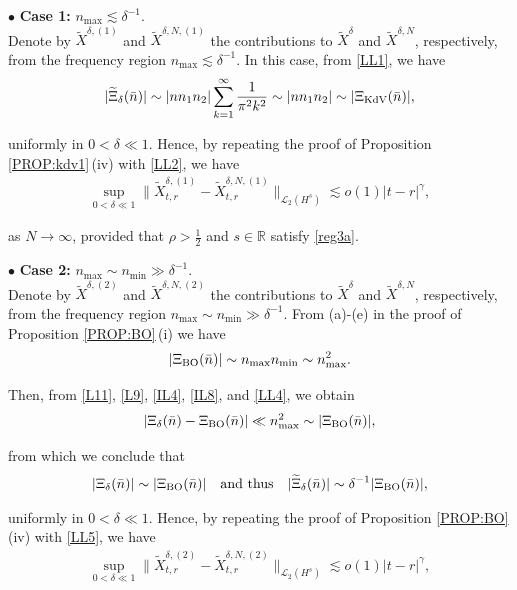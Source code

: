 \documentclass[letterpaper, 11pt,  reqno]{amsart}
\newcommand{\1}{\hspace{0.5mm}\text{I}\hspace{0.5mm}}
\newcommand{\noi}{\noindent}
\newcommand{\R}{\mathbb{R}}
\newcommand{\bul}{\bullet}
\newcommand{\dl}{\delta}
\newcommand{\g}{\gamma}
\newcommand{\wt}{\widetilde}
\newcommand{\les}{\lesssim}
\newcommand{\cL}{\mathcal{L}}
\newcommand{\BO}{\text{\rm BO} }
\newcommand{\KDV}{\text{\rm KdV} }
\numberwithin{equation}{section}
\numberwithin{theorem}{section}
\begin{document}
\noi
$\bul$ {\bf Case 1:} $n_{\max} \les \dl^{-1}$.\\
\indent
Denote by 
 $\wt X^{\dl, (1)}$ and $ \wt X^{\dl,N, (1)}$
the contributions to 
$\wt X^\dl$ and $\wt X^{\dl,N}$, respectively, 
from the frequency region $n_{\max} \les \dl^{-1}$. 
In this case, from \eqref{LL1}, we have
\begin{align}
|\wt \Xi_\dl(\bar n)|
\sim  |n n_1 n_2|
 \sum_{k=1}^{\infty}   
 \frac1{\pi^2 k^2}
\sim  |n n_1 n_2|
\sim |\Xi_\KDV(\bar n)|, 
\label{LL2}
\end{align}

\noi
uniformly in $0 < \dl \ll 1$.
Hence, by repeating the proof of Proposition 
\ref{PROP:kdv1}\,(iv) with \eqref{LL2}, we have 
\begin{align}
\sup_{0 < \dl \ll 1} \|  \wt X^{\dl, (1)}_{t,r} - \wt X^{\dl,N, (1)}_{t,r} \|_{\cL_2 (H^s)}
\les
 o(1) |t-r|^\g, 
\label{LL3}
\end{align}


\noi
as $N \to \infty$, 
provided that 
 $\rho > \frac 12$ and $s \in \R$
satisfy 
\eqref{reg3a}.




\medskip

\noi
$\bul$ {\bf Case 2:} $n_{\max} \sim n_{\min} \gg \dl^{-1}$.\\
\indent
Denote by 
 $\wt X^{\dl, (2)}$ and $ \wt X^{\dl,N, (2)}$
the contributions to 
$\wt X^\dl$ and $\wt X^{\dl,N}$, respectively, 
from the frequency region 
$n_{\max} \sim n_{\min} \gg \dl^{-1}$.
 From (a)-(e) in the proof of Proposition \ref{PROP:BO}\,(i)
 we have
\begin{align}
|\Xi_\BO(\bar n)|\sim n_{\max}n_{\min}
\sim n_{\max}^2.
\label{LL4}
\end{align}

\noi
Then, 
from \eqref{L11},  \eqref{L9}, 
 \eqref{IL4}, \eqref{IL8}, and  \eqref{LL4}, 
we obtain
\begin{align*}
|\Xi_\dl(\bar n) - \Xi_\BO(\bar n)| \ll 
n_{\max}^2\sim |\Xi_\BO(\bar n)|, 
\end{align*}


\noi
from which we conclude that 
\begin{align}
|\Xi_\dl(\bar n)|\sim | \Xi_\BO(\bar n)|
\quad \text{and thus}\quad
|\wt \Xi_\dl(\bar n)|\sim \dl^{-1} | \Xi_\BO(\bar n)|, 
\label{LL5}
\end{align}

\noi
uniformly in $0 < \dl \ll 1$.
Hence, by repeating the proof of Proposition 
\ref{PROP:BO}\,(iv) with \eqref{LL5}, we have 
\begin{align}
\sup_{0 < \dl \ll 1} \|  \wt X^{\dl, (2)}_{t,r} - \wt X^{\dl,N, (2)}_{t,r} \|_{\cL_2 (H^s)}
\les
 o(1) |t-r|^\g, 
\label{LL6}
\end{align}
\end{document}
